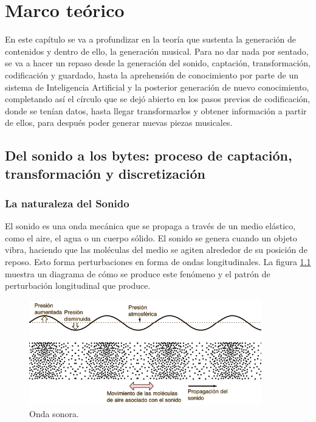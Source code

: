 
\cleardoublepage

\chapter{Marco teórico}

En este capítulo se va a profundizar en la teoría que sustenta la generación de contenidos y dentro de ello, la generación musical. Para no dar nada por sentado, se va a hacer un repaso desde la generación del sonido, captación, transformación, codificación y guardado, hasta la aprehensión de conocimiento por parte de un sistema de Inteligencia Artificial y la posterior generación de nuevo conocimiento, completando así el círculo que se dejó abierto en los pasos previos de codificación, donde se tenían datos, hasta llegar transformarlos y obtener información a partir de ellos, para después poder generar nuevas piezas musicales.

\section{Del sonido a los bytes: proceso de captación, transformación y discretización}

\subsection{La naturaleza del Sonido}
El sonido es una onda mecánica que se propaga a través de un medio elástico, como el aire, el agua o un cuerpo sólido. El sonido se genera cuando un objeto vibra, haciendo que las moléculas del medio se agiten alrededor de su posición de reposo. Esto forma perturbaciones en forma de ondas longitudinales. La figura \ref{fig:onda_sonora} muestra un diagrama de cómo se produce este fenómeno y el patrón de perturbación longitudinal que produce.

\begin{figure}[H]
  \centering
  \includegraphics[width=0.9\textwidth]{images/wave.png}
  \caption{Onda sonora.}
  \label{fig:onda_sonora}
\end{figure}

